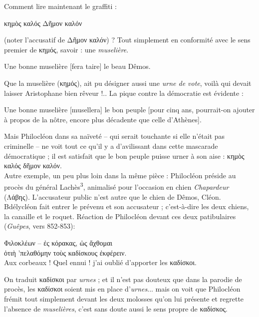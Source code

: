 \documentclass[12pt]{book}%
\newcommand{\italique}[1]{\textit{#1}}%
\newcommand{\citComm}[1]{\begin{quoting}[vskip=0pt] #1 \end{quoting}}%
\newcommand{\marqueur}[1]{\textsuperscript{#1}}%
\newcommand{\eff}[1]{%
{\color{orange}#1}%
}%
\newenvironment{groupe}{%
\pstart%
\ledgroup%
}{%
\pend %
}%
\begin{document}
\begin{pages}
\begin{Leftside}
\begin{groupe}
{{Comment lire maintenant le graffiti : %
\citComm{κημὸς καλός Δῆμον καλόν}%
(noter l'accusatif de Δῆμον καλόν) ?
Tout simplement en conformité avec le sens premier de κημός, savoir : une \italique{muselière}.%
\citComm{Une bonne muselière [fera taire] le beau Dêmos.}%
Que la muselière (κημός), ait pu désigner aussi une \italique{urne de vote}, voilà qui devait laisser Aristophane bien rêveur !..
La pique contre la démocratie est évidente :
\citComm{Une bonne muselière [musellera] le bon peuple [pour cinq ans, pourrait-on ajouter à propos de la nôtre, encore plus décadente que celle d'Athènes].}%
Mais Philocléon dans sa naïveté -- qui serait touchante si elle n'était pas criminelle -- ne voit tout ce qu'il y a d'avilissant dans cette mascarade démocratique ; il est satisfait que le bon peuple puisse urner à son aise :
κημὸς καλός δῆμον καλόν.\\
Autre exemple, un peu plus loin dans la même pièce : Philocléon préside au procès du général Lachès\marqueur{3}, animalisé pour l'occasion en chien \italique{Chapardeur} (Λάβης). L'accusateur public n'est autre que le chien de Dêmos, Cléon. Bdélycléon fait entrer le prévenu et son accusateur ; c'est-à-dire les deux chiens, la canaille et le roquet. Réaction de Philocléon devant ces deux patibulaires (\italique{Guêpes}, vers 852-853): %
\citComm{Φιλοκλέων -- ἐς κόρακας, ὡς ἄχθομαι\\
ὁτιὴ 'πελαθόμην τοὺς καδίσκους ἐκφέρειν.\\
Aux corbeaux ! Quel ennui ! j'ai oublié d'apporter les καδίσκοι.}%
On traduit καδίσκοι par \italique{urnes} ; et il n'est pas douteux que dans la parodie de procès, les καδίσκοι soient mis en place d'\italique{urnes}... mais on voit que Philocléon frémit tout simplement devant les deux molosses qu'on lui présente et regrette l'absence de \italique{muselières}, c'est sans doute aussi le sens propre de καδίσκος.\\
}}
\end{groupe}
\end{Leftside}
\end{pages}
\end{document}
